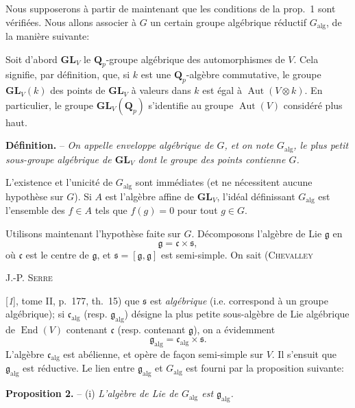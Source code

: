 Nous supposerons à partir de maintenant que les conditions de la prop.~1 sont vérifiées. Nous allons associer à $G$ un certain groupe algébrique réductif $G_{\mathrm{alg}}$, de la manière suivante:

Soit d’abord $\mathbf{GL}_V$ le $\mathbf{Q}_p$-groupe algébrique des automorphismes de $V$. Cela signifie, par définition, que, si $k$ est une $\mathbf{Q}_p$-algèbre commutative, le groupe $\mathbf{GL}_V(k)$ des points de $\mathbf{GL}_V$ à valeurs dans $k$ est égal à $\operatorname{Aut}(V\otimes k)$. En particulier, le groupe $\mathbf{GL}_V(\mathbf{Q}_p)$ s’identifie au groupe $\operatorname{Aut}(V)$ considéré plus haut.

\textbf{Définition.} -- \textit{On appelle enveloppe algébrique de $G$, et on note $G_{\mathrm{alg}}$, le plus petit sous-groupe algébrique de $\mathbf{GL}_V$ dont le groupe des points contienne $G$.}

L’existence et l’unicité de $G_{\mathrm{alg}}$ sont immédiates (et ne nécessitent aucune hypothèse sur $G$). Si $A$ est l’algèbre affine de $\mathbf{GL}_V$, l’idéal définissant $G_{\mathrm{alg}}$ est l’ensemble des $f\in A$ tels que $f(g)=0$ pour tout $g\in G$.

Utilisons maintenant l’hypothèse faite sur $G$. Décomposons l’algèbre de Lie $\mathfrak{g}$ en
\[
\mathfrak{g}=\mathfrak{c}\times\mathfrak{s},
\]
où $\mathfrak{c}$ est le centre de $\mathfrak{g}$, et $\mathfrak{s}=[\mathfrak{g},\mathfrak{g}]$ est semi-simple. On sait (\textsc{Chevalley}
\begin{center}\small J.-P. \textsc{Serre}\end{center}
[\textit{1}], tome II, p.~177, th.~15) que $\mathfrak{s}$ est \textit{algébrique} (i.e. correspond à un groupe algébrique); si $\mathfrak{c}_{\mathrm{alg}}$ (resp. $\mathfrak{g}_{\mathrm{alg}}$) désigne la plus petite sous-algèbre de Lie algébrique de $\operatorname{End}(V)$ contenant $\mathfrak{c}$ (resp. contenant $\mathfrak{g}$), on a évidemment
\[
\mathfrak{g}_{\mathrm{alg}}=\mathfrak{c}_{\mathrm{alg}}\times\mathfrak{s}.
\]
L’algèbre $\mathfrak{c}_{\mathrm{alg}}$ est abélienne, et opère de façon semi-simple sur $V$. Il s’ensuit que $\mathfrak{g}_{\mathrm{alg}}$ est réductive. Le lien entre $\mathfrak{g}_{\mathrm{alg}}$ et $G_{\mathrm{alg}}$ est fourni par la proposition suivante:

\textbf{Proposition 2.} -- (i) \textit{L’algèbre de Lie de $G_{\mathrm{alg}}$ est $\mathfrak{g}_{\mathrm{alg}}$.}

